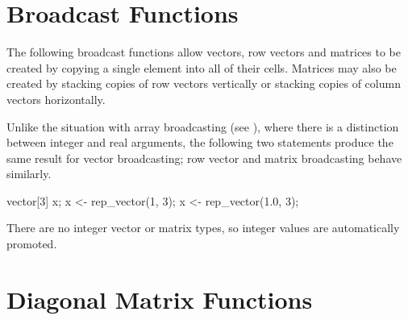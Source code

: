\section{Broadcast Functions}\label{matrix-broadcast.section}

The following broadcast functions allow vectors, row vectors and
matrices to be created by copying a single element into all of their
cells.  Matrices may also be created by stacking copies of row vectors
vertically or stacking copies of column vectors horizontally.

\begin{description}
%
%
%
%
%
%
\end{description}
%

Unlike the situation with array broadcasting (see ), where there is a
distinction between integer and real arguments, the following two
statements produce the same result for vector broadcasting;  row vector
and matrix broadcasting behave similarly.
%
\begin{stancode}
vector[3] x;
x <- rep_vector(1, 3);
x <- rep_vector(1.0, 3);  
\end{stancode}
%
There are no integer vector or matrix types, so integer values are
automatically promoted.


\section{Diagonal Matrix Functions}

\begin{description}
%
%
%
\end{description}



